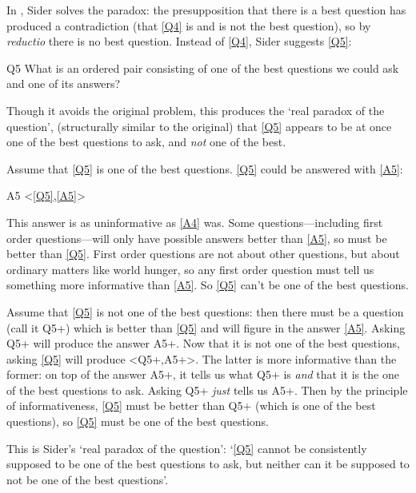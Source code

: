 In \autocite[]{Sider1997}, Sider solves the paradox: the presupposition that there is a best question has produced a contradiction (that \ref{Q4} is and is not the best question), so by \textit{reductio} there is no best question.
Instead of \ref{Q4}, Sider suggests \ref{Q5}:

	\begin{principle}{Q5}\label{Q5}
	What is an ordered pair consisting of one of the best questions we could ask and one of its answers?
	\end{principle}

Though it avoids the original problem, this produces the `real paradox of the question', (structurally similar to the original) that \ref{Q5} appears to be at once one of the best questions to ask, and \emph{not} one of the best.

Assume that \ref{Q5} is one of the best questions.
\ref{Q5} could be answered  with \ref{A5}:
	
	\begin{principle}{A5}\label{A5}
	<\ref{Q5},\ref{A5}>
	\end{principle}

This answer is as uninformative as \ref{A4} was.
Some questions---including first order questions---will only have possible answers better than \ref{A5}, so must be better than \ref{Q5}.
First order questions are not about other questions, but about ordinary matters like world hunger, so any first order question must tell us something more informative than \ref{A5}.
So \ref{Q5} can't be one of the best questions.
\autocite[4]{Sider1997}

Assume that \ref{Q5} is not one of the best questions: then there must be a question (call it Q5+) which is better than \ref{Q5} and will figure in the answer \ref{A5}.
Asking Q5+ will produce the answer A5+.
Now that it is not one of the best questions, asking \ref{Q5} will produce <Q5+,A5+>.
The latter is more informative than the former: on top of the answer A5+, it tells us what Q5+ is \emph{and} that it is the one of the best questions to ask.
Asking Q5+ \emph{just} tells us A5+.
Then by the principle of informativeness, \ref{Q5} must be better than Q5+ (which is one of the best questions), so \ref{Q5} must be one of the best questions.

This is Sider's `real paradox of the question': `\ref{Q5} cannot be consistently supposed to be one of the best questions to ask, but neither can it be supposed to not be one of the best questions'.

